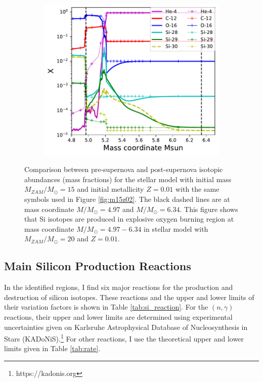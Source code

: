 \documentclass{brandeis-thesis3.2}
\def \msun {M_{\odot}}
\begin{document}
\begin{figure}[H]
    \centering
    \begin{subfigure}[c]{0.6\textwidth}
        \includegraphics[width=\textwidth]{figs/200.01.pdf}
    \end{subfigure}
    \caption{Comparison between pre-supernova and post-supernova isotopic abundances (mass fractions) for the stellar model with initial mass $M_{ZAM}/\msun =15$ and initial metallicity $Z=0.01$ with the same symbols used in Figure \ref{fig:m15z02}. The black dashed lines are at mass coordinate $M/\msun = 4.97$ and $M/\msun = 6.34$. This figure shows that Si isotopes are produced in explosive oxygen burning region at mass coordinate $M/\msun = 4.97-6.34$ in stellar model with $M_{ZAM}/\msun =20$ and $Z=0.01$.}
    \label{fig:m20z01}
\end{figure}



\subsection{Main Silicon Production Reactions}
In the identified regions, I find six major reactions for the production and destruction of silicon isotopes. These reactions and the upper and lower limits of their variation factors is shown in Table \ref{tab:si_reaction}. For the $(n,\gamma)$ reactions, their upper and lower limits are determined using experimental uncertainties given on Karlsruhe Astrophysical Database of Nucleosynthesis in Stars (KADoNiS).\footnote{https://kadonis.org} For other reactions, I use the theoretical upper and lower limits given in Table \ref{tab:rate}.
\end{document}
